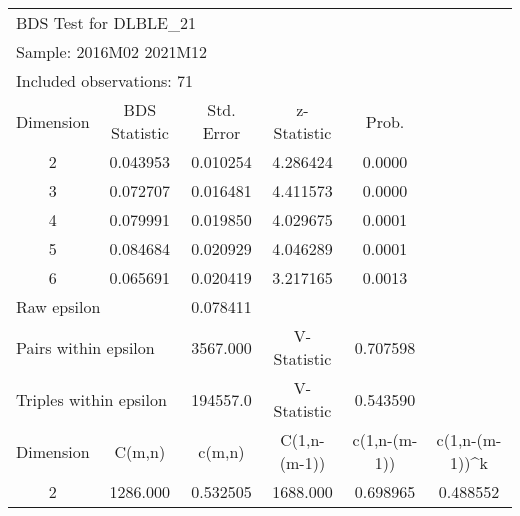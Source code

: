 \begin{tabular}{lrrrrr}
\toprule
\multicolumn{3}{l}{BDS Test for DLBLE\_21}&\multicolumn{1}{c}{}&\multicolumn{1}{c}{}&\multicolumn{1}{c}{}\\
\multicolumn{3}{l}{Sample: 2016M02 2021M12}&\multicolumn{1}{c}{}&\multicolumn{1}{c}{}&\multicolumn{1}{c}{}\\
\multicolumn{3}{l}{Included observations: 71}&\multicolumn{1}{c}{}&\multicolumn{1}{c}{}&\multicolumn{1}{c}{}\\
\midrule
\multicolumn{1}{c}{Dimension}&\multicolumn{1}{c}{BDS Statistic}&\multicolumn{1}{c}{Std. Error}&\multicolumn{1}{c}{z-Statistic}&\multicolumn{1}{c}{Prob.}&\multicolumn{1}{c}{}\\
\multicolumn{1}{c}{2}&\multicolumn{1}{c}{0.043953}&\multicolumn{1}{c}{0.010254}&\multicolumn{1}{c}{4.286424}&\multicolumn{1}{c}{0.0000}&\multicolumn{1}{c}{}\\
\multicolumn{1}{c}{3}&\multicolumn{1}{c}{0.072707}&\multicolumn{1}{c}{0.016481}&\multicolumn{1}{c}{4.411573}&\multicolumn{1}{c}{0.0000}&\multicolumn{1}{c}{}\\
\multicolumn{1}{c}{4}&\multicolumn{1}{c}{0.079991}&\multicolumn{1}{c}{0.019850}&\multicolumn{1}{c}{4.029675}&\multicolumn{1}{c}{0.0001}&\multicolumn{1}{c}{}\\
\multicolumn{1}{c}{5}&\multicolumn{1}{c}{0.084684}&\multicolumn{1}{c}{0.020929}&\multicolumn{1}{c}{4.046289}&\multicolumn{1}{c}{0.0001}&\multicolumn{1}{c}{}\\
\multicolumn{1}{c}{6}&\multicolumn{1}{c}{0.065691}&\multicolumn{1}{c}{0.020419}&\multicolumn{1}{c}{3.217165}&\multicolumn{1}{c}{0.0013}&\multicolumn{1}{c}{}\\
\midrule
\multicolumn{2}{l}{Raw epsilon}&\multicolumn{1}{c}{0.078411}&\multicolumn{1}{c}{}&\multicolumn{1}{c}{}&\multicolumn{1}{c}{}\\
\multicolumn{2}{l}{Pairs within epsilon}&\multicolumn{1}{c}{3567.000}&\multicolumn{1}{c}{V-Statistic}&\multicolumn{1}{c}{0.707598}&\multicolumn{1}{c}{}\\
\multicolumn{2}{l}{Triples within epsilon}&\multicolumn{1}{c}{194557.0}&\multicolumn{1}{c}{V-Statistic}&\multicolumn{1}{c}{0.543590}&\multicolumn{1}{c}{}\\
\midrule
\multicolumn{1}{c}{Dimension}&\multicolumn{1}{c}{C(m,n)}&\multicolumn{1}{c}{c(m,n)}&\multicolumn{1}{c}{C(1,n-(m-1))}&\multicolumn{1}{c}{c(1,n-(m-1))}&\multicolumn{1}{c}{c(1,n-(m-1))\textasciicircum k}\\
\multicolumn{1}{c}{2}&\multicolumn{1}{c}{1286.000}&\multicolumn{1}{c}{0.532505}&\multicolumn{1}{c}{1688.000}&\multicolumn{1}{c}{0.698965}&\multicolumn{1}{c}{0.488552}\\

\end{tabular}
